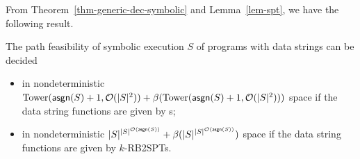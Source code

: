 From Theorem~\ref{thm-generic-dec-symbolic} and Lemma~\ref{lem-spt}, we have the following result.
\begin{theorem}\label{thm-spt}
The path feasibility of symbolic execution $S$ of programs with data strings can be decided 

\begin{itemize}
	\item in nondeterministic $\mathrm{Tower}(\mathsf{asgn}(S)+1, \mathcal{O}(|S|^2)) + \beta(\mathrm{Tower}(\mathsf{asgn}(S)+1, \mathcal{O}(|S|^2)))$  space if the data string functions are given by \SSPT{}s;
	
	\item  in nondeterministic $|S|^{|S|^{\mathcal{O}(\mathsf{asgn}(S))}} + \beta(|S|^{|S|^{\mathcal{O}(\mathsf{asgn}(S))}})$ space if the data string functions are given by $k$-RB2SPTs. %
	
\end{itemize}
%
%
\end{theorem}

